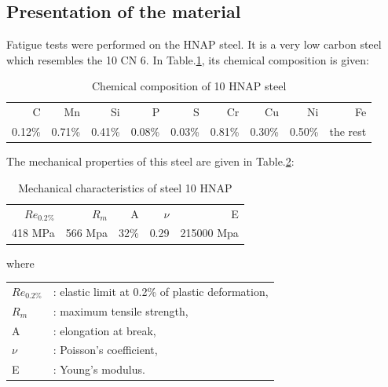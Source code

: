 \subsection{Presentation of the material}
Fatigue tests were performed on the HNAP steel. It is a very low carbon steel
which resembles the 10 CN 6. In Table.\ref{tab.10HNAPchem}, its chemical composition is given:	
\begin{table}[!h]
\centering
\begin{tabular}{rrrrrrrrr}
\hline
C      & Mn     & Si     & P      & S      & Cr     & Cu     & Ni     & Fe       \\
0.12\% & 0.71\% & 0.41\% & 0.08\% & 0.03\% & 0.81\% & 0.30\% & 0.50\% & the rest \\ \hline
\end{tabular}
\caption{Chemical composition of 10 HNAP steel\cite{Bedkowski1994}}
\label{tab.10HNAPchem}
\end{table}
The mechanical properties of this steel are given in Table.\ref{tab.10HNAPmec}:
\begin{table}[!h]
\centering
\begin{tabular}{rrrrr}
\hline
$Re_{0.2\%}$ & $R_m$   & A    & $\nu$ & E          \\
418 MPa     & 566 Mpa & 32\% & 0.29  & 215000 Mpa \\ \hline
\end{tabular}
\caption{Mechanical characteristics of steel 10 HNAP\cite{Bedkowski_1994}}
\label{tab.10HNAPmec}
\end{table}

where 
\begin{table}[!h]
\centering
\begin{tabular}{ll}
$Re_{0.2\%}$ & : elastic limit at 0.2\% of plastic deformation, \\
$R_m$      & : maximum tensile strength,                                                                  \\
A          & : elongation at break,                                                                       \\
$\nu$      & : Poisson's coefficient,                                                                     \\
E          & : Young's modulus.                                                                          
\end{tabular}
\end{table}

